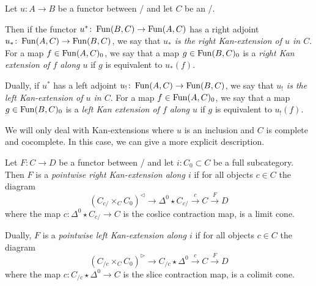 \begin{definition}
    Let $u\colon A\to B$ be a functor between \inftycats/ and let $C$ be an \inftycat/.
    
    Then if the functor $u^*\colon\operatorname{Fun}(B,C)\to\operatorname{Fun}(A,C)$ has a right adjoint $u_*\colon\operatorname{Fun}(A,C)\to\operatorname{Fun}(B,C)$, we say that \emph{$u_*$ is the right Kan-extension of $u$ in $C$}.
    For a map $f\in\operatorname{Fun}(A,C)_0$, we say that a map $g\in\operatorname{Fun}(B,C)_0$ is a \emph{right Kan extension of $f$ along $u$} if $g$ is equivalent to $u_*(f)$.

    Dually, if $u^*$ has a left adjoint $u_!\colon\operatorname{Fun}(A,C)\to\operatorname{Fun}(B,C)$, we say that \emph{$u_!$ is the left Kan-extension of $u$ in $C$}.
    For a map $f\in\operatorname{Fun}(A,C)_0$, we say that a map $g\in\operatorname{Fun}(B,C)_0$ is a \emph{left Kan extension of $f$ along $u$} if $g$ is equivalent to $u_!(f)$.
\end{definition}
We will only deal with Kan-extensions where $u$ is an inclusion and $C$ is complete and cocomplete.
In this case, we can give a more explicit description.
\begin{definition}\label{def:ptwiseKanExt} %
    Let $F\colon C\to D$ be a functor between \inftycats/ and let $i\colon C_0\subset C$ be a full subcategory.
    Then $F$ is a \emph{pointwise right Kan-extension along $i$} if for all objects $c\in C$ the diagram
    \begin{equation*}
        \left(C_{c/}\times_C C_0\right)^{\lhd}\to \Delta^0\star C_{c/}\xrightarrow{c} C\xrightarrow{F} D
    \end{equation*}
    where the map $c\colon\Delta^0\star C_{c/}\to C$ is the coslice contraction map, is a limit cone.

    Dually, $F$ is a \emph{pointwise left Kan-extension along $i$} if for all objects $c\in C$ the diagram
    \begin{equation*}
        \left(C_{/c}\times_C C_0\right)^{\rhd}\to C_{/c}\star\Delta^0 \xrightarrow{c} C\xrightarrow{F} D
    \end{equation*}
    where the map $c\colon C_{/c}\star\Delta^0\to C$ is the slice contraction map, is a colimit cone.
\end{definition}
